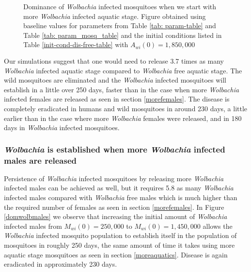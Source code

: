 \documentclass{ws-rv9x6}
\begin{document}
\begin{figure}[H]
    \centering
    
    \caption{Dominance of \textit{Wolbachia} infected mosquitoes when we start with more \textit{Wolbachia} infected aquatic stage. Figure obtained using baseline values for parameters from Table \ref{tab: param-table} and Table \ref{tab: param_mosq_table} and the initial conditions listed in Table \ref{init-cond-dis-free-table} with $A_{wi}(0)=1,850,000$ }
    \label{fig:my_label}
\end{figure}


Our simulations suggest that one would need to release 3.7 times as many \textit{Wolbachia} infected aquatic stage compared to \textit{Wolbachia} free aquatic stage. The wild mosquitoes are eliminated and the \textit{Wolbachia} infected mosquitoes will establish in a little over 250 days, faster than in the case when more \textit{Wolbachia} infected females are released as seen in section \ref{morefemales}. The disease is completely eradicated in humans and wild mosquitoes in around 230 days, a little earlier than in the case where more \textit{Wolbachia} females were released, and in 180 days in \textit{Wolbachia} infected mosquitoes.


\subsubsection{\textit{Wolbachia} is established when more \textit{Wolbachia} infected males are released}

Persistence of \textit{Wolbachia} infected mosquitoes by releasing more \textit{Wolbachia} infected males can be achieved as well, but it requires 5.8 as many \textit{Wolbachia} infected males compared with \textit{Wolbachia} free males which is much higher than the required number of females as seen in section \ref{morefemales}. In Figure \ref{domwolbmales} we observe that increasing the initial amount of \textit{Wolbachia} infected males from $M_{wi}(0) = 250,000$ to $M_{wi}(0) = 1,450,000$ allows the \textit{Wolbachia} infected mosquito population to establish itself in the population of mosquitoes in roughly 250 days, the same amount of time it takes using more aquatic stage mosquitoes as seen in section \ref{moreaquatics}. Disease is again eradicated in approximately 230 days.
\end{document}
